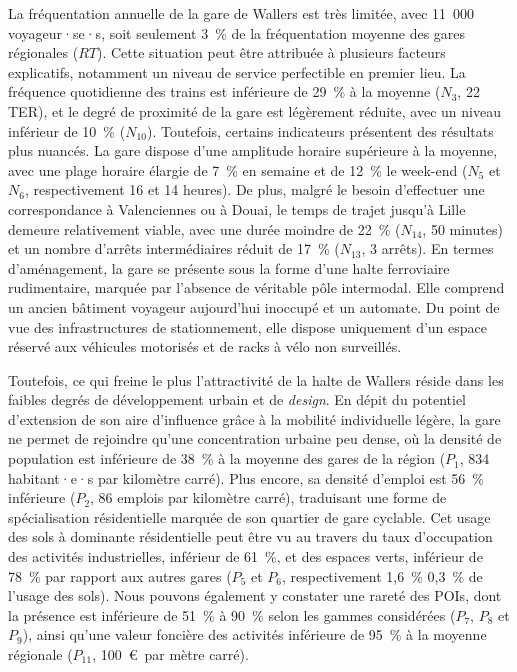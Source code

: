 \begin{refsegment}
La fréquentation annuelle de la gare de Wallers est très limitée, avec 11~000 voyageur·se·s, soit seulement 3~\% de la fréquentation moyenne des gares régionales (\(RT\)). Cette situation peut être attribuée à plusieurs facteurs explicatifs, notamment un niveau de service perfectible en premier lieu. La fréquence quotidienne des trains est inférieure de 29~\% à la moyenne (\(N_{3}\), 22 \acrshort{TER}), et le degré de proximité de la gare est légèrement réduite, avec un niveau inférieur de 10~\% (\(N_{10}\)). Toutefois, certains indicateurs présentent des résultats plus nuancés. La gare dispose d'une amplitude horaire supérieure à la moyenne, avec une plage horaire élargie de 7~\% en semaine et de 12~\% le week-end (\(N_{5}\) et \(N_{6}\), respectivement 16 et 14 heures). De plus, malgré le besoin d'effectuer une correspondance à Valenciennes ou à Douai, le temps de trajet jusqu'à Lille demeure relativement viable, avec une durée moindre de 22~\% (\(N_{14}\), 50 minutes) et un nombre d'arrêts intermédiaires réduit de 17~\% (\(N_{13}\), 3 arrêts). En termes d'aménagement, la gare se présente sous la forme d'une halte ferroviaire rudimentaire, marquée par l'absence de véritable pôle intermodal. Elle comprend un ancien bâtiment voyageur aujourd'hui inoccupé et un automate. Du point de vue des infrastructures de stationnement, elle dispose uniquement d'un espace réservé aux véhicules motorisés et de racks à vélo non surveillés.%

Toutefois, ce qui freine le plus l'attractivité de la halte de Wallers réside dans les faibles degrés de développement urbain et de \textsl{design}. En dépit du potentiel d'extension de son aire d'influence grâce à la mobilité individuelle légère, la gare ne permet de rejoindre qu'une concentration urbaine peu dense, où la densité de population est inférieure de 38~\% à la moyenne des gares de la région (\(P_{1}\), 834 habitant·e·s par kilomètre carré). Plus encore, sa densité d'emploi est 56~\% inférieure (\(P_{2}\), 86 emplois par kilomètre carré), traduisant une forme de spécialisation résidentielle marquée de son quartier de gare cyclable. Cet usage des sols à dominante résidentielle peut être vu au travers du taux d'occupation des activités industrielles, inférieur de 61~\%, et des espaces verts, inférieur de 78~\% par rapport aux autres gares (\(P_{5}\) et \(P_{6}\), respectivement 1,6~\% 0,3~\% de l'usage des sols). Nous pouvons également y constater une rareté des \acrshort{POIs}, dont la présence est inférieure de 51~\% à 90~\% selon les gammes considérées  (\(P_{7}\), \(P_{8}\) et \(P_{9}\)), ainsi qu'une valeur foncière des activités inférieure de 95~\% à la moyenne régionale (\(P_{11}\), 100~\euro~par mètre carré).%


\end{refsegment}
